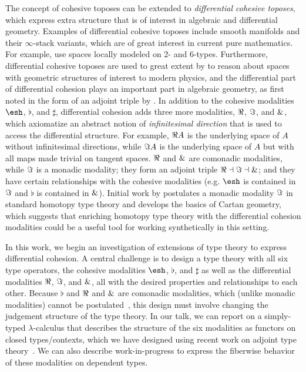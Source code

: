\documentclass{article}
\begin{document}
The concept of cohesive toposes can be extended to \emph{differential
  cohesive toposes}, which express extra structure that is of interest
in algebraic and differential geometry.  Examples of differential
cohesive toposes include smooth manifolds and their $\infty$-stack
variants, which are of great interest in current pure mathematics. For
example, \citet{SatiSchreiberStasheff2012} use spaces locally modeled
on 2- and 6-types.  Furthermore, differential cohesive toposes are used
to great extent by \citet{Schreiber2013} to reason about spaces with
geometric structures of interest to modern physics, and the differential
part of differential cohesion plays an important part in algebraic
geometry, as first noted in the form of an adjoint triple by
\citet{SimpsonTeleman}.  In addition to the cohesive modalities
$\shape$, $\flat$, and $\sharp$, differential cohesion adds three more
modalities, $\Re$, $\Im$, and $\&$, which axiomatize an abstract
notion of \emph{infinitesimal direction} that is used to access the
differential structure.  For example, $\Re A$ is the underlying space
of $A$ without infinitesimal directions, while $\Im A$ is the
underlying space of $A$ but with all maps made trivial on tangent
spaces.  $\Re$ and $\&$ are comonadic modalities, while $\Im$ is a
monadic modality; they form an adjoint triple $\Re \dashv \Im \dashv
\&$; and they have certain relationships with the cohesive modalities
(e.g. $\shape$ is contained in $\Im$ and $\flat$ is contained in
$\&$).  Initial work by \citet{Wellen2017} postulates a monadic
modality $\Im$ in standard homotopy type theory and develops the
basics of Cartan geometry, which suggests that enriching homotopy type
theory with the differential cohesion modalities could be a useful tool
for working synthetically in this setting.
 

In this work, we begin an investigation of extensions of type theory to
express differential cohesion.  A central challenge is to design a type
theory with all six type operators, the cohesive modalities $\shape$,
$\flat$, and $\sharp$ as well as the differential modalities $\Re$,
$\Im$, and $\&$, all with the desired properties and relationships
to each other.  Because $\flat$ and $\Re$ and $\&$ are comonadic
modalities, which (unlike monadic modalities) cannot be
postulated~\citep{Shulman2015}, this design must involve changing the
judgement structure of the type theory.  In our talk, we can report on a
simply-typed $\lambda$-calculus that describes the structure of the six
modalities as functors on closed types/contexts, which we have designed
using recent work on adjoint type theory~\citep{Licata2017}.  We can
also describe work-in-progress to express the fiberwise behavior of
these modalities on dependent types.
\end{document}
